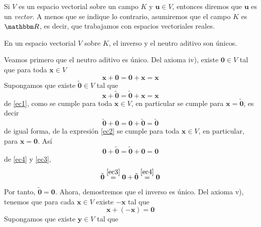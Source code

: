 Si $V$ es un espacio vectorial sobre un campo $K$ y $\mathbf{u} \in V$, entonces diremos que $\mathbf{u}$ es un \emph{vector}. A menos que se indique lo contrario, asumiremos que el campo $K$ es $\RR$, es decir, que trabajamos con espacios vectoriales reales.

\begin{theorem}{}{}
     En un espacio vectorial $V$ sobre $K$, el inverso y el neutro aditivo son únicos.

    \tcblower
    \demostracion Veamos primero que el neutro aditivo es único. Del axioma iv), existe $\mathbf{0} \in V$ tal que para toda $\mathbf{x} \in V$
    \begin{equation}
        \mathbf{x} + \mathbf{0} = \mathbf{0} + \mathbf{x} = \mathbf{x} \label{ec1}
    \end{equation}
    Supongamos que existe $\tilde{\mathbf{0}} \in V$ tal que
    \begin{equation}
        \mathbf{x} + \tilde{\mathbf{0}} = \tilde{\mathbf{0}} + \mathbf{x} = \mathbf{x} \label{ec2}
    \end{equation}
    de \eqref{ec1}, como se cumple para toda $\mathbf{x} \in V$, en particular se cumple para $\mathbf{x} = \tilde{\mathbf{0}}$, es decir
    \begin{equation}
        \tilde{\mathbf{0}} + \mathbf{0} = \mathbf{0} + \tilde{\mathbf{0}} = \tilde{\mathbf{0}} \label{ec3}
    \end{equation}
    de igual forma, de la expresión \eqref{ec2} se cumple para toda $\mathbf{x} \in V$, en particular, para $\mathbf{x} = \mathbf{0}$. Así
    \begin{equation}
        \mathbf{0} + \tilde{\mathbf{0}} = \tilde{\mathbf{0}} + \mathbf{0} = \mathbf{0} \label{ec4}
    \end{equation}
    de \eqref{ec4} y \eqref{ec3},
    \begin{equation*}
        \tilde{\mathbf{0}} \stackrel{\eqref{ec3}}{=} \mathbf{0} + \tilde{\mathbf{0}} \stackrel{\eqref{ec4}}{=} \mathbf{0}
    \end{equation*}
    Por tanto, $\tilde{\mathbf{0}} = \mathbf{0}$. Ahora, demostremos que el inverso es único. Del axioma v), tenemos que para cada $\mathbf{x} \in V$ existe $-\mathbf{x}$ tal que
    \begin{equation}
        \mathbf{x} + (-\mathbf{x}) = \mathbf{0} \label{ec5}
    \end{equation}
    Supongamos que existe $\mathbf{y} \in V$ tal que
    \begin{equation}

\end{equation}
\end{theorem}
